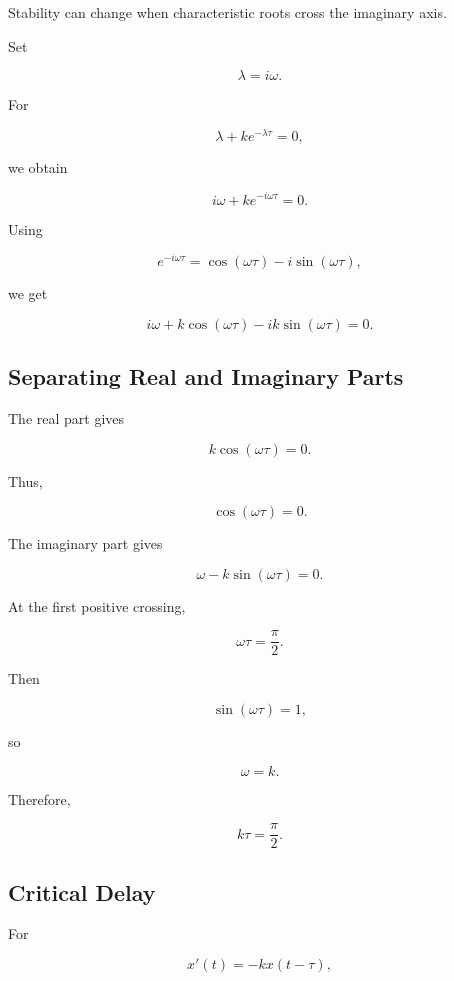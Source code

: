 Stability can change when characteristic roots cross the imaginary axis.

Set

\[
\boxed{
\lambda=i\omega.
}
\]

For

\[
\lambda
+
ke^{-\lambda\tau}
=
0,
\]

we obtain

\[
i\omega
+
k
e^{-i\omega\tau}
=
0.
\]

Using

\[
e^{-i\omega\tau}
=
\cos(\omega\tau)
-
i\sin(\omega\tau),
\]

we get

\[
i\omega
+
k\cos(\omega\tau)
-
ik\sin(\omega\tau)
=
0.
\]

\subsection{Separating Real and Imaginary Parts}
\label{subsec:dde-real-imaginary-parts}

The real part gives

\[
\boxed{
k\cos(\omega\tau)=0.
}
\]

Thus,

\[
\boxed{
\cos(\omega\tau)=0.
}
\]

The imaginary part gives

\[
\boxed{
\omega
-
k\sin(\omega\tau)
=
0.
}
\]

At the first positive crossing,

\[
\omega\tau
=
\frac{\pi}{2}.
\]

Then

\[
\sin(\omega\tau)=1,
\]

so

\[
\boxed{
\omega=k.
}
\]

Therefore,

\[
\boxed{
k\tau
=
\frac{\pi}{2}.
}
\]

\subsection{Critical Delay}
\label{subsec:critical-delay-pure-feedback}

For

\[
x'(t)
=
-kx(t-\tau),
\]

